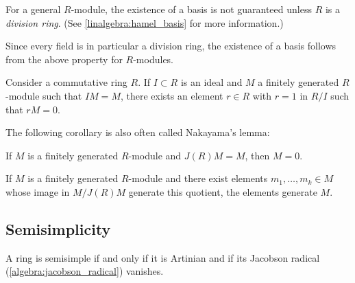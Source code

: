     \begin{property}\label{algebra:module_basis}
        For a general $R$-module, the existence of a basis is not guaranteed unless $R$ is a \textit{division ring}. (See \cref{linalgebra:hamel_basis} for more information.)
    \end{property}
    \begin{result}
        Since every field is in particular a division ring, the existence of a basis follows from the above property for $R$-modules.
    \end{result}


    \begin{theorem}\label{algebra:nakayama}
        Consider a commutative ring $R$. If $I\subset R$ is an ideal and $M$ a finitely generated $R$-module such that $IM=M$, there exists an element $r\in R$ with $r=1$ in $R/I$ such that $rM=0$.
    \end{theorem}
    The following corollary is also often called Nakayama's lemma:
    \begin{result}
        If $M$ is a finitely generated $R$-module and $J(R)M=M$, then $M=0$.
    \end{result}
    \begin{result}
        If $M$ is a finitely generated $R$-module and there exist elements $m_1,\ldots,m_k\in M$ whose image in $M/J(R)M$ generate this quotient, the elements generate $M$.
    \end{result}

\subsection{Semisimplicity}

    \begin{property}
        A ring is semisimple if and only if it is Artinian and if its Jacobson radical (\cref{algebra:jacobson_radical}) vanishes.
    \end{property}

